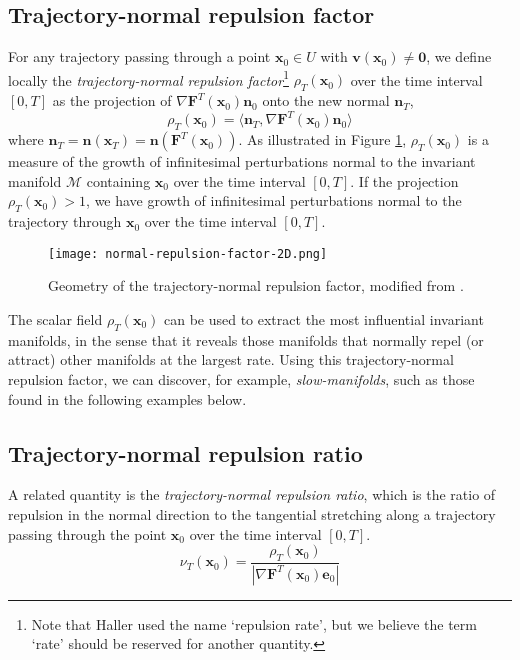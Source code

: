 \documentclass[onecolumn,3p]{elsarticle}
\begin{document}
	\subsection{Trajectory-normal repulsion factor}
	For any trajectory passing through a point $\mathbf{x}_0 \in U$ with 
	$\mathbf{v}(\mathbf{x}_0) \ne \mathbf{0}$, we define locally the {\it trajectory-normal repulsion factor}\footnote{Note that Haller \cite{haller_variational_2011} used the name `repulsion rate', but we believe the term `rate' should be reserved for another quantity.} $\rho_T(\mathbf{x}_0)$ over the time interval $[0, T]$ as  the projection of $\nabla\mathbf{F}^T (\mathbf{x}_0) \mathbf{n}_0 $ onto the new normal 
	$\mathbf{n}_T$,
	\begin{equation}
		\rho_T(\mathbf{x}_0) = \langle  \mathbf{n}_T , \nabla \mathbf{F}^T (\mathbf{x}_0) \mathbf{n}_0 \rangle
	\end{equation}
	where $\mathbf{n}_T = \mathbf{n}(\mathbf{x}_T) = \mathbf{n}(\mathbf{F}^T (\mathbf{x}_0))$. 
	As illustrated in Figure \ref{fig:normal-repulsion-factor-2D}, $\rho_T(\mathbf{x}_0)$ is a measure of the growth of infinitesimal perturbations normal to the invariant manifold $\mathcal{M}$ containing $\mathbf{x}_0$ over the time interval $[0,T]$.
	If the projection $\rho_T(\mathbf{x}_0) >1$, we have growth of infinitesimal perturbations normal to the trajectory through $\mathbf{x}_0$ over the time interval $[0,T]$.
	\begin{figure}[t]
		\centering
		\texttt{[image: normal-repulsion-factor-2D.png]}
		\caption{Geometry of the trajectory-normal repulsion factor, modified from \cite{haller_variational_2011}.}
		\label{fig:normal-repulsion-factor-2D}
	\end{figure}
	
	The scalar field $\rho_T(\mathbf{x}_0)$  can be used to extract the most influential invariant manifolds, in the sense that it reveals those manifolds that normally repel (or attract) other manifolds at the largest rate. Using this trajectory-normal repulsion factor, we can discover, for example, {\it slow-manifolds}, such as those found in the following examples below.
	
	\subsection{Trajectory-normal repulsion ratio}
	A related quantity is the {\it trajectory-normal repulsion ratio}, which is the ratio of repulsion in the normal direction to the tangential stretching along a trajectory passing through the point $\textbf{x}_0$ over the time interval $[0, T]$.
	\begin{equation}
		\nu_T(\mathbf{x}_0) = \frac{\rho_T(\mathbf{x}_0)}{\left|\nabla\mathbf{F}^T (\mathbf{x}_0) \mathbf{e}_0\right|}
	\end{equation}
	
\end{document}
